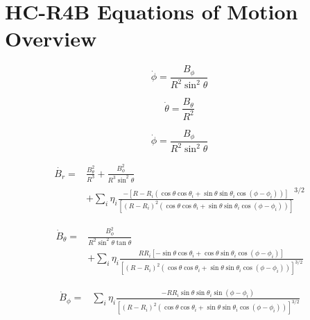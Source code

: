 \chapter{HC-R4B Equations of Motion Overview} \label{apx:hcr4b-overview}

\begin{equation} \tag{2.67}
    \boxed{
            \dot{\phi} = \frac{B_\phi}{R^2 \sin^2{\theta}}
    }
\end{equation}


\begin{equation} \tag{2.72}
    \boxed{
            \dot{\theta} = \frac{B_\theta}{R^2}
    }
\end{equation}


\begin{equation} \tag{2.76}
    \boxed{
            \dot{\phi} = \frac{B_\phi}{R^2 \sin^2{\theta}}
    }
\end{equation}


\begin{equation} \tag{2.86}
    \boxed{
        \!\begin{aligned}
        \dot{B_r} = &\frac{B_\theta^2}{R^3} + \frac{B_\phi^2}{R^3 \sin^2{\theta}} \\
        & + \sum\limits_{i} \eta_i \frac{-\left[R - R_i \left(\cos{\theta}\cos{\theta_i} + \sin{\theta}\sin{\theta_i}\cos{(\phi - \phi_i)}\right) \right]}{\left[(R - R_i)^2 \left(\cos{\theta}\cos{\theta_i} + \sin{\theta}\sin{\theta_i}\cos{(\phi - \phi_i)} \right) \right]}^{3/2}
        \end{aligned}
    }
\end{equation}


\begin{equation} \tag{2.87}
    \boxed{
        \!\begin{aligned}
            \dot{B}_\theta = &\frac{B_\phi^2}{R^2 \sin^2{\theta} \tan{\theta}} \\
            &+ \sum\limits_{i} \eta_i \frac{R R_i \left[-\sin{\theta}\cos{\theta_i} + \cos{\theta}\sin{\theta_i}\cos{(\phi - \phi_i)} \right]}{\left[(R - R_i)^2 \left(\cos{\theta}\cos{\theta_i} + \sin{\theta}\sin{\theta_i}\cos{(\phi - \phi_i)} \right) \right]^{3/2}}
        \end{aligned}
    }
\end{equation}


\begin{equation} \tag{2.88}
    \boxed{
        \!\begin{aligned}
            \dot{B}_\phi = &\sum\limits_{i} \eta_i \frac{- R R_i \sin{\theta}\sin{\theta_i}\sin{(\phi - \phi_i)}}{\left[(R - R_i)^2 \left(\cos{\theta}\cos{\theta_i} + \sin{\theta}\sin{\theta_i}\cos{(\phi - \phi_i)} \right) \right]^{3/2}}
        \end{aligned}
    }
\end{equation}
